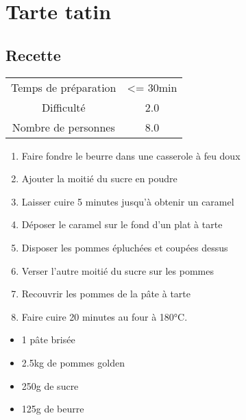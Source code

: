 \newpage
\section{Tarte tatin}
    \label{sec:Tarte tatin}
    \subsection{Recette}
    \vspace{1cm}


    \begin{center}
        \begin{tabular}{c|c}
            Temps de préparation & <= 30min \\
            Difficulté & 2.0 \\
            Nombre de personnes & 8.0 
        \end{tabular}
    \end{center}{}

    \vspace{1cm}
    \hline
    \vspace{1cm}

    \begin{minipage}{.7\textwidth}
        \begin{enumerate}
            \item Faire fondre le beurre dans une casserole à feu doux
	    \item Ajouter la moitié du sucre en poudre
	    \item Laisser cuire 5 minutes jusqu'à obtenir un caramel
	    \item Déposer le caramel sur le fond d'un plat à tarte
	    \item Disposer les pommes épluchées et coupées dessus
	    \item Verser l'autre moitié du sucre sur les pommes
	    \item Recouvrir les pommes de la pâte à tarte
	    \item Faire cuire 20 minutes au four à 180°C.

        \end{enumerate}
    \end{minipage}
    \begin{minipage}{.3\textwidth}
        \begin{flushleft}
        \begin{itemize}
            \item 1 pâte brisée
	    \item 2.5kg de pommes golden
	    \item 250g de sucre
	    \item 125g de beurre

        \end{itemize}
        \end{flushleft}
    \end{minipage}
    
